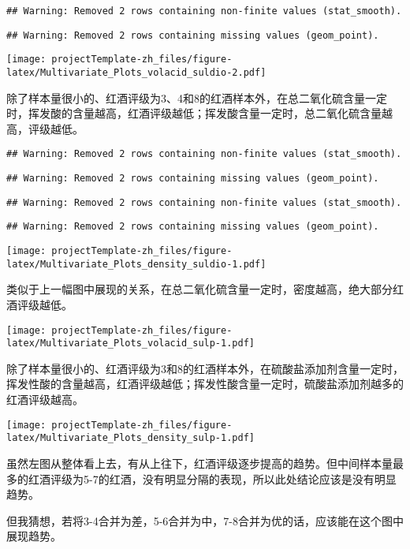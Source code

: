 \documentclass[]{article}
\begin{document}
\begin{verbatim}
## Warning: Removed 2 rows containing non-finite values (stat_smooth).
\end{verbatim}

\begin{verbatim}
## Warning: Removed 2 rows containing missing values (geom_point).
\end{verbatim}

\texttt{[image: projectTemplate-zh\_files/figure-latex/Multivariate\_Plots\_volacid\_suldio-2.pdf]}

除了样本量很小的、红酒评级为3、4和8的红酒样本外，在总二氧化硫含量一定时，挥发酸的含量越高，红酒评级越低；挥发酸含量一定时，总二氧化硫含量越高，评级越低。

\begin{verbatim}
## Warning: Removed 2 rows containing non-finite values (stat_smooth).
\end{verbatim}

\begin{verbatim}
## Warning: Removed 2 rows containing missing values (geom_point).
\end{verbatim}

\begin{verbatim}
## Warning: Removed 2 rows containing non-finite values (stat_smooth).
\end{verbatim}

\begin{verbatim}
## Warning: Removed 2 rows containing missing values (geom_point).
\end{verbatim}

\texttt{[image: projectTemplate-zh\_files/figure-latex/Multivariate\_Plots\_density\_suldio-1.pdf]}

类似于上一幅图中展现的关系，在总二氧化硫含量一定时，密度越高，绝大部分红酒评级越低。

\texttt{[image: projectTemplate-zh\_files/figure-latex/Multivariate\_Plots\_volacid\_sulp-1.pdf]}

除了样本量很小的、红酒评级为3和8的红酒样本外，在硫酸盐添加剂含量一定时，挥发性酸的含量越高，红酒评级越低；挥发性酸含量一定时，硫酸盐添加剂越多的红酒评级越高。

\texttt{[image: projectTemplate-zh\_files/figure-latex/Multivariate\_Plots\_density\_sulp-1.pdf]}

虽然左图从整体看上去，有从上往下，红酒评级逐步提高的趋势。但中间样本量最多的红酒评级为5-7的红酒，没有明显分隔的表现，所以此处结论应该是没有明显趋势。

但我猜想，若将3-4合并为差，5-6合并为中，7-8合并为优的话，应该能在这个图中展现趋势。
\end{document}
